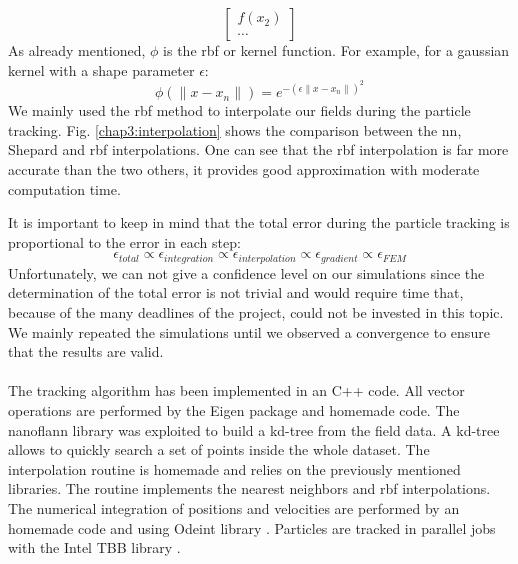 \begin{refsection}
\begin{equation}
\begin{bmatrix}
      f(x_{2}) \\
      \cdots
    \end{bmatrix}
  \end{equation}
  As already mentioned, $\phi$ is the \acrshort{rbf} or kernel function. For example, for a gaussian kernel with a shape parameter $\epsilon$:
  \begin{equation}
    \phi(\lVert x - x_{n}\rVert) = e^{-(\epsilon\lVert x - x_{n}\rVert)^{2}}
  \end{equation}
  We mainly used the \acrshort{rbf} method to interpolate our fields during the particle tracking. Fig. \ref{chap3:interpolation} shows the comparison between the \acrshort{nn}, Shepard and \acrshort{rbf} interpolations. One can see that the \acrshort{rbf} interpolation is far more accurate than the two others, it provides good approximation with moderate computation time.

  It is important to keep in mind that the total error during the particle tracking is proportional to the error in each step:
  \begin{equation}
    \epsilon_{total} \propto \epsilon_{integration}\propto\epsilon_{interpolation}\propto\epsilon_{gradient}\propto\epsilon_{FEM}
  \end{equation}
  Unfortunately, we can not give a confidence level on our simulations since the determination of the total error is not trivial and would require time that, because of the many deadlines of the project, could not be invested in this topic.
  We mainly repeated the simulations until we observed a convergence to ensure that the results are valid.


  

  \paragraph{}
  The tracking algorithm has been implemented in an C++ code. All vector operations are performed by the Eigen \cite{eigenweb} package and homemade code. The nanoflann library \cite{blanco2014nanoflann} was exploited to build a kd-tree from the field data. A kd-tree allows to quickly search a set of points inside the whole dataset. The interpolation routine is homemade and relies on the previously mentioned libraries. The routine implements the nearest neighbors and \acrshort{rbf} interpolations. The numerical integration of positions and velocities are performed by an homemade code and using Odeint library \cite{Ahnert2011,Mulansky2014}. Particles are tracked in parallel jobs with the Intel TBB library \cite{tbb2019}.


\end{refsection}
